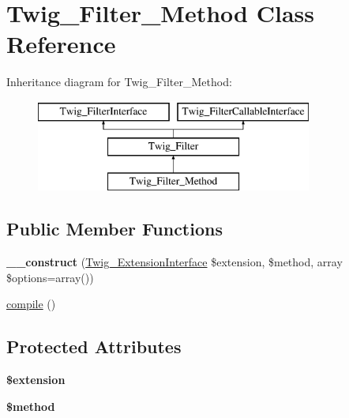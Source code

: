 \hypertarget{class_twig___filter___method}{}\section{Twig\+\_\+\+Filter\+\_\+\+Method Class Reference}
\label{class_twig___filter___method}
Inheritance diagram for Twig\+\_\+\+Filter\+\_\+\+Method\+:\begin{figure}[H]
\begin{center}
\leavevmode
\includegraphics[height=3.000000cm]{class_twig___filter___method}
\end{center}
\end{figure}
\subsection*{Public Member Functions}
\begin{DoxyCompactItemize}
\item 
\hypertarget{class_twig___filter___method_a7d07ee619832b0ff21eaf3c7c0159c3f}{}{\bfseries \+\_\+\+\_\+construct} (\hyperlink{interface_twig___extension_interface}{Twig\+\_\+\+Extension\+Interface} \$extension, \$method, array \$options=array())\label{class_twig___filter___method_a7d07ee619832b0ff21eaf3c7c0159c3f}

\item 
\hyperlink{class_twig___filter___method_a3815e7c2e73f00c2ebffcf5b90eef3b1}{compile} ()
\end{DoxyCompactItemize}
\subsection*{Protected Attributes}
\begin{DoxyCompactItemize}
\item 
\hypertarget{class_twig___filter___method_aed02cd2cd0ee08bd99a2ac1ef4f955ce}{}{\bfseries \$extension}\label{class_twig___filter___method_aed02cd2cd0ee08bd99a2ac1ef4f955ce}

\item 
\hypertarget{class_twig___filter___method_a12661b2fc0f57f97e30a1620889ce9c6}{}{\bfseries \$method}\label{class_twig___filter___method_a12661b2fc0f57f97e30a1620889ce9c6}

\end{DoxyCompactItemize}


